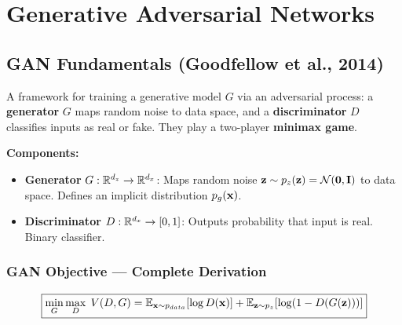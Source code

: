 \section{Generative Adversarial Networks}

\subsection{GAN Fundamentals (Goodfellow et al., 2014)}

\begin{definition}[GAN]
A framework for training a generative model $G$ via an adversarial process: a \textbf{generator} $G$ maps random noise to data space, and a \textbf{discriminator} $D$ classifies inputs as real or fake. They play a two-player \textbf{minimax game}.
\end{definition}

\textbf{Components:}
\begin{itemize}
\item \textbf{Generator} $G: \mathbb{R}^{d_z} \to \mathbb{R}^{d_x}$: Maps random noise $\mathbf{z} \sim p_z(\mathbf{z}) = \mathcal{N}(\mathbf{0}, \mathbf{I})$ to data space. Defines an implicit distribution $p_g(\mathbf{x})$.
\item \textbf{Discriminator} $D: \mathbb{R}^{d_x} \to [0,1]$: Outputs probability that input is real. Binary classifier.
\end{itemize}

\subsubsection{GAN Objective — Complete Derivation}
\begin{equation}\label{eq:gan_loss}
\boxed{\min_G \max_D \; V(D,G) = \mathbb{E}_{\mathbf{x} \sim p_{data}}[\log D(\mathbf{x})] + \mathbb{E}_{\mathbf{z} \sim p_z}[\log(1 - D(G(\mathbf{z})))]}
\end{equation}

